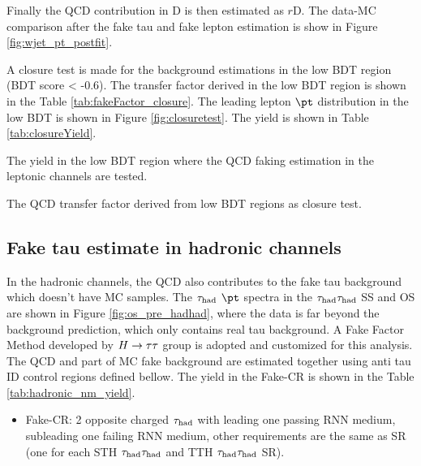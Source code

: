 Finally the QCD contribution in D is then estimated as $r$D.
The data-MC comparison after the fake tau and fake lepton estimation is show in Figure \ref{fig:wjet_pt_postfit}.


A closure test is made for the background estimations in the low BDT region (BDT score < -0.6). The transfer factor derived in the low BDT region is shown in the Table \ref{tab:fakeFactor_closure}. The leading lepton $\pt$ distribution in the low BDT is shown in Figure \ref{fig:closuretest}. The yield is shown in Table \ref{tab:closureYield}.




\begin{table}
\caption{The yield in the low BDT region where the QCD faking estimation in the leptonic channels are tested.}
\label{tab:closureYield}

\end{table}


\begin{table}
\caption{The QCD transfer factor derived from low BDT regions as closure test.}
\label{tab:fakeFactor_closure}

\end{table}

\newpage
\subsection{Fake tau estimate in hadronic channels}
\label{sec:ss_method}

In the hadronic channels, the QCD also contributes to the fake tau background which doesn't have MC samples. The $\tau_\text{had}$ $\pt$ spectra in the $\tau_\text{had}{}\tau_\text{had}$ SS and OS are shown in Figure \ref{fig:os_pre_hadhad}, where the data is far beyond the background prediction, which only contains real tau background. A Fake Factor Method developed by $H \rightarrow \tau\tau$ group \cite{Htautau-note} is adopted and customized for this analysis. The QCD and part of MC fake background are estimated together using anti tau ID control regions defined bellow. The yield in the Fake-CR is shown in the Table \ref{tab:hadronic_nm_yield}. 

\begin{itemize}
\item{Fake-CR: 2 opposite charged $\tau_\text{had}$ with leading one passing RNN medium, subleading one failing RNN medium, other requirements are the same as SR (one for each STH $\tau_\text{had}{}\tau_\text{had}$ and TTH $\tau_\text{had}{}\tau_\text{had}$ SR).}
\end{itemize}

